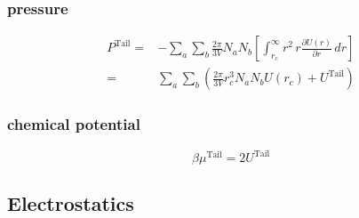 \subsubsection*{pressure}
\begin{align}
 P^{\text{Tail}}=&-\sum_a \sum_b \frac{2\pi}{3V} N_a N_b \left[\int_{r_c}^\infty r^2\, r\frac{\partial U\left(r\right)}{\partial r}\, dr\right]\\
    =&\sum_a \sum_b\left(\frac{2\pi}{3V} r_c^3 N_a N_b U\left(r_c\right)+U^{\text{Tail}}\right)
\end{align}
\subsubsection*{chemical potential}
\begin{equation}
 \beta \mu^{\text{Tail}}=2 U^{\text{Tail}}
\end{equation}

\subsection{Electrostatics}

